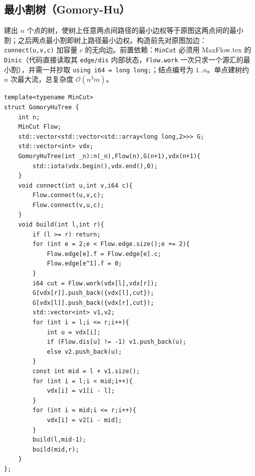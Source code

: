 \subsection{最小割树（Gomory-Hu）}

建出 $n$ 个点的树，使树上任意两点间路径的最小边权等于原图这两点间的最小割；之后两点最小割即树上路径最小边权。构造前先对原图加边：\texttt{connect(u,v,c)} 加容量 $c$ 的无向边。前置依赖：\texttt{MinCut} 必须用 MaxFlow.tex 的 \texttt{Dinic}（代码直接读取其 \texttt{edge/dis} 内部状态，\texttt{Flow.work} 一次只求一个源汇的最小割），并需一并抄取 \texttt{using i64 = long long;}；结点编号为 $1..n$。单点建树约 $n$ 次最大流，总复杂度 $\mathcal{O}(n^3 m)$。

\begin{lstlisting}
template<typename MinCut>
struct GomoryHuTree {
    int n;
    MinCut Flow;
    std::vector<std::vector<std::array<long long,2>>> G;
    std::vector<int> vdx;
    GomoryHuTree(int _n):n(_n),Flow(n),G(n+1),vdx(n+1){
        std::iota(vdx.begin(),vdx.end(),0);
    }
    void connect(int u,int v,i64 c){
        Flow.connect(u,v,c);
        Flow.connect(v,u,c);
    }
    void build(int l,int r){
        if (l >= r) return;
        for (int e = 2;e < Flow.edge.size();e += 2){
            Flow.edge[e].f = Flow.edge[e].c;
            Flow.edge[e^1].f = 0;
        }
        i64 cut = Flow.work(vdx[l],vdx[r]);
        G[vdx[r]].push_back({vdx[l],cut});
        G[vdx[l]].push_back({vdx[r],cut});
        std::vector<int> v1,v2;
        for (int i = l;i <= r;i++){
            int u = vdx[i];
            if (Flow.dis[u] != -1) v1.push_back(u);
            else v2.push_back(u);
        }
        const int mid = l + v1.size();
        for (int i = l;i < mid;i++){
            vdx[i] = v1[i - l];
        }
        for (int i = mid;i <= r;i++){
            vdx[i] = v2[i - mid];
        }
        build(l,mid-1);
        build(mid,r);
    }
};
\end{lstlisting}

